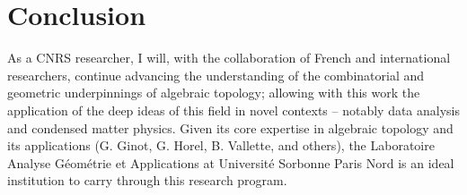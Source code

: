 
\section{Conclusion} \label{s:conclusion}

As a CNRS researcher, I will, with the collaboration of French and international researchers, continue advancing the understanding of the combinatorial and geometric underpinnings of algebraic topology; allowing with this work the application of the deep ideas of this field in novel contexts -- notably data analysis and condensed matter physics.
Given its core expertise in algebraic topology and its applications (G. Ginot, G. Horel, B. Vallette, and others), the Laboratoire Analyse Géométrie et Applications at Université Sorbonne Paris Nord is an ideal institution to carry through this research program.